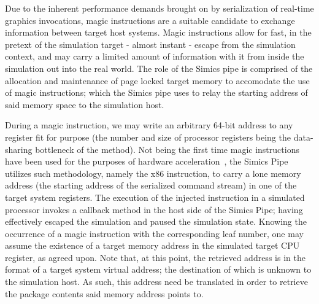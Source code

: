 Due to the inherent performance demands brought on by serialization of real-time graphics invocations, magic instructions are a suitable candidate to exchange information between target host systems.
Magic instructions allow for fast, in the pretext of the simulation target - almost instant - escape from the simulation context, and may carry a limited amount of information with it from inside the simulation out into the real world.
The role of the Simics pipe is comprised of the allocation and maintenance of page locked target memory to accomodate the use of magic instructions; which the Simics pipe uses to relay the starting address of said memory space to the simulation host.

During a magic instruction, we may write an arbitrary 64-bit address to any register fit for purpose (the number and size of processor registers being the data-sharing bottleneck of the method).
Not being the first time magic instructions have been used for the purposes of hardware acceleration~, the Simics Pipe utilizes such methodology, namely the  x86 instruction, to carry a lone memory address (the starting address of the serialized command stream) in one of the target system registers.
The execution of the injected instruction in a simulated processor invokes a callback method in the host side of the Simics Pipe; having effectively escaped the simulation and paused the simulation state.
Knowing the occurrence of a magic instruction with the corresponding leaf number, one may assume the existence of a target memory address in the simulated target CPU register, as agreed upon.
Note that, at this point, the retrieved address is in the format of a target system virtual address; the destination of which is unknown to the simulation host.
As such, this address need be translated in order to retrieve the package contents said memory address points to.

